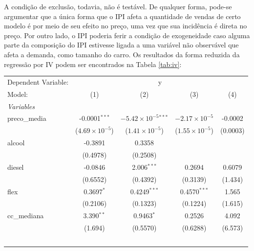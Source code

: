 \documentclass{article}
\begin{document}
A condição de exclusão, todavia, não é testável. De qualquer forma, pode-se argumentar que a única forma que o IPI afeta a quantidade de vendas de certo modelo é por meio de seu efeito no preço, uma vez que sua incidência é direta no preço. Por outro lado, o IPI poderia ferir a condição de exogeneidade caso alguma parte da composição do IPI estivesse ligada a uma variável não observável que afeta a demanda, como tamanho do carro. Os resultados da forma reduzida da regressão por IV podem ser encontrados na Tabela \ref{tab:iv}:

\begin{table}[H]
\begingroup
\centering
\begin{tabular}{lcccc}
   \tabularnewline \midrule \midrule
   Dependent Variable: & \multicolumn{4}{c}{y}\\
   Model:        & (1)                     & (2)                            & (3)                     & (4)\\  
   \midrule
   \emph{Variables}\\
   preco\_media  & -0.0001$^{***}$         & $-5.42\times 10^{-5}$$^{***}$  & $-2.17\times 10^{-5}$   & -0.0002\\   
                 & ($4.69\times 10^{-5}$)  & ($1.41\times 10^{-5}$)         & ($1.55\times 10^{-5}$)  & (0.0003)\\   
   alcool        & -0.3891                 & 0.3358                         &                         &   \\   
                 & (0.4978)                & (0.2508)                       &                         &   \\   
   diesel        & -0.0846                 & 2.006$^{***}$                  & 0.2694                  & 0.6079\\   
                 & (0.6552)                & (0.4392)                       & (0.3139)                & (1.434)\\   
   flex          & 0.3697$^{*}$            & 0.4249$^{***}$                 & 0.4570$^{***}$          & 1.565\\   
                 & (0.2106)                & (0.1323)                       & (0.1224)                & (1.615)\\   
   cc\_mediana   & 3.390$^{**}$            & 0.9463$^{*}$                   & 0.2526                  & 4.092\\   
                 & (1.694)                 & (0.5570)                       & (0.6288)                & (6.573)\\   
$$
\end{tabular}
\end{table}
\end{document}
